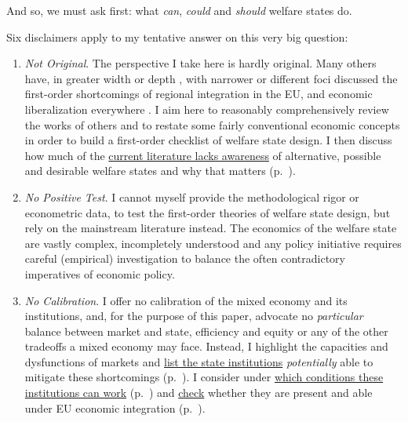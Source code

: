 \documentclass[11pt,a4paper,oneside]{article}
\begin{document}
And so, we must ask first:
what \emph{can}, \emph{could} and \emph{should} welfare states do.

Six disclaimers apply to my tentative answer on this very big question: \label{sec:disclaimers}

\begin{enumerate}
	\item \label{it:not-original} \emph{Not Original}.
		The perspective I take here is hardly original.
		Many others have, in greater width \citep{Stiglitz2002} or depth \citep{Sinn2004}, with narrower \citep{Scharpf1997} or different foci \citep{Zurn-2000-aa} discussed the first-order shortcomings of regional integration in the \gls{EU}, and economic liberalization everywhere \citep{Stiglitz2002}.
		I aim here to reasonably comprehensively review the works of others and to restate some fairly conventional economic concepts in order to build a first-order checklist of welfare state design.
		I then discuss how much of the \hyperref[sec:Literature]{current literature lacks awareness} of alternative, possible and desirable welfare states and why that matters (p.~\pageref{sec:Literature}).

	\item \label{it:no-test} \emph{No Positive Test}.
		I cannot myself provide the methodological rigor or econometric data, to test the first-order theories of welfare state design, but rely on the mainstream literature instead.
		The economics of the welfare state are vastly complex, incompletely understood and any policy initiative requires careful (empirical) investigation to balance the often contradictory imperatives of economic policy.

	\item \label{it:no-calibration} \emph{No Calibration}.
		I offer no calibration of the mixed economy and its institutions, and, for the purpose of this paper, advocate no \emph{particular} balance between market and state, efficiency and equity or any of the other tradeoffs a mixed economy may face.
		Instead, I highlight the capacities and dysfunctions of markets and \hyperref[sec:ends]{list the state institutions} \emph{potentially} able to mitigate these shortcomings (p.~\pageref{sec:ends}).
		I consider under \hyperref[sec:means]{which conditions these institutions can work} (p.~\pageref{sec:means}) and \hyperref[sec:defunct]{check} whether they are present and able under \gls{EU} economic integration (p.~\pageref{sec:defunct}).


\end{enumerate}
\end{document}
